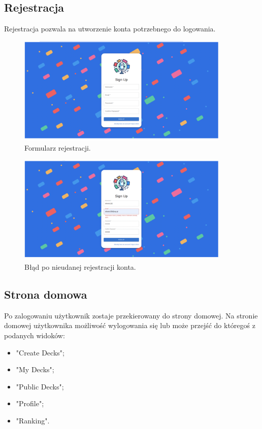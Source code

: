 \subsection{Rejestracja}
Rejestracja pozwala na utworzenie konta potrzebnego do logowania.


\begin{figure}[H]
    \centering
    \includegraphics[width=0.9\textwidth]{chapters/chapter_10/images_web/web_register}
    \caption{Formularz rejestracji.}
    \label{img:web_register}
\end{figure}


\begin{figure}[H]
    \centering
    \includegraphics[width=0.9\textwidth]{chapters/chapter_10/images_web/web_register_2}
    \caption{Błąd po nieudanej rejestracji konta.}
    \label{img:web_register_2}
\end{figure}


\subsection{Strona domowa}
Po zalogowaniu użytkownik zostaje przekierowany do strony domowej. Na stronie domowej użytkownika możliwość wylogowania się lub może przejść do któregoś z podanych widoków:
\begin{itemize}
    \item "Create Decks";
    \item "My Decks";
    \item "Public Decks";
    \item "Profile";
    \item "Ranking".
\end{itemize}


